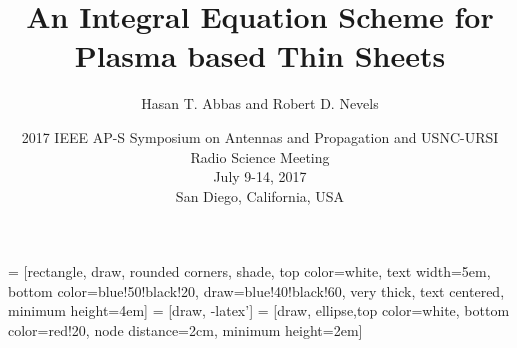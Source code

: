 \documentclass[mathserif,16pt,xcolor=table]{beamer}
\title{An Integral Equation Scheme for Plasma based Thin Sheets}
\author[Abbas and Nevels]{Hasan T. Abbas and Robert D. Nevels}
\institute{Department of Electrical \& Computer Engineering\\[\medskipamount] \pgfuseimage{tamuecenbig}}
\date[July 12, 2017]{2017 IEEE AP-S Symposium on Antennas and Propagation and USNC-URSI Radio Science Meeting\\
July 9-14, 2017\\
San Diego, California, USA}
\begin{document}
\preto\subequations{\ifhmode\unskip\fi}

 = [rectangle, draw, rounded corners, shade, top color=white, text width=5em,
bottom color=blue!50!black!20, draw=blue!40!black!60, very thick, text centered, minimum height=4em]
 = [draw, -latex']
 = [draw, ellipse,top color=white, bottom color=red!20, node distance=2cm, minimum height=2em]

\beamertemplateballitem

\frame{\titlepage}


%
%
\end{document}
